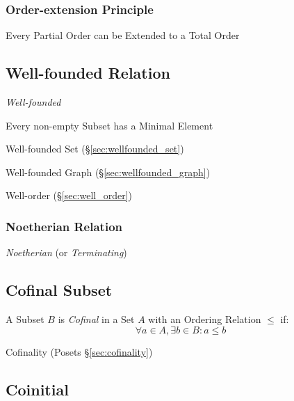 \subsubsection{Order-extension Principle}
\label{sec:order_extension_principle}

Every Partial Order can be Extended to a Total Order



\subsection{Well-founded Relation}\label{sec:well_founded}

\emph{Well-founded}

Every non-empty Subset has a Minimal Element

Well-founded Set (\S\ref{sec:wellfounded_set})

Well-founded Graph (\S\ref{sec:wellfounded_graph})

Well-order (\S\ref{sec:well_order})



\subsubsection{Noetherian Relation}\label{sec:noetherian_relation}

\emph{Noetherian} (or \emph{Terminating})



\subsection{Cofinal Subset}\label{sec:cofinal_subset}

A Subset $B$ is \emph{Cofinal} in a Set $A$ with an Ordering Relation
$\leq$ if:
\[
  \forall a \in A, \exists b \in B : a \leq b
\]

Cofinality (Posets \S\ref{sec:cofinality})



\subsection{Coinitial}\label{sec:coinitial_subset}

